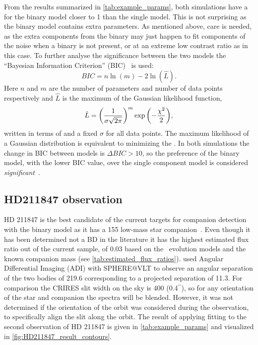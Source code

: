 From the results summarized in \cref{tab:example_params}, both simulations have a \textchisquaredreduced{} for the binary model closer to 1 than the single model.
This is not surprising as the binary model contains extra parameters.
As mentioned above, care is needed, as the extra components from the binary may just happen to fit components of the noise when a binary is not present, or at an extreme low contrast ratio as in this case.
To further analyse the significance between the two models the ``Bayesian Information Criterion'' ({BIC})~\citep{schwarz_estimating_1978} is used:
\begin{equation}
{BIC} = n\ln{(m)} - 2\ln{(\hat{L})}.
\end{equation}
Here \(n\) and \(m\) are the number of parameters and number of data points respectively and \(\hat{L}\) is the maximum of the Gaussian likelihood function, 
\begin{equation}
\hat{L} = {\left(\frac{1}{\sigma \sqrt{2\pi}}\right)}^{m} \exp{\left(-\frac{{\chi}^{2}}{2}\right)},
\end{equation}
written in terms of \textchisquared{} and a fixed \(\sigma\) for all data points.
The maximum likelihood of a Gaussian distribution is equivalent to minimizing the \textchisquared{}.
In both simulations the change in {BIC} between models is \(\Delta {BIC} >10\), so the preference of the binary model, with the lower {BIC} value, over the single component model is considered \emph{significant}~\citep{kass_bayes_1995}.

\subsection{HD211847 observation}
\label{subsec:results-hd211847}
{HD 211847} is the best candidate of the current targets for companion detection with the \textchisquared{} binary model as it has a 155\Mjup{} low-mass star companion~\citet{moutou_eccentricity_2017}.
Even though it has been determined not a {BD} in the literature it has the highest estimated flux ratio out of the current sample, of 0.03 based on the~\citet{baraffe_new_2015} evolution models and the known companion mass (see \cref{tab:estimated_flux_ratios}).
\citet{moutou_eccentricity_2017} used Angular Differential Imaging ({ADI}) with {SPHERE@VLT} to observe an angular separation of the two bodies of 219.6\mas{} corresponding to a projected separation of 11.3\AU{}.
For comparison the {CRIRES} slit width on the sky is 400\mas{} (0.4\(^{\prime\prime}\)), so for any orientation of the star and companion the spectra will be blended.
However, it was not determined if the orientation of the orbit was considered during the observation, to specifically align the slit along the orbit.
The result of applying \textchisquared{} fitting to the second observation of {HD 211847} is given in \cref{tab:example_params} and visualized in \cref{fig:HD211847_result_contours}.

